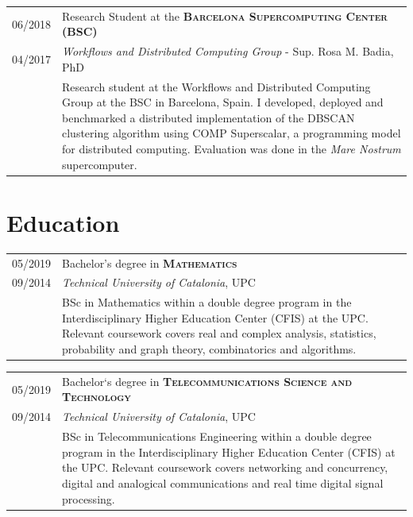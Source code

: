 \documentclass[a4paper,10pt]{article} %
\begin{document}
\begin{tabular}{R{1.5cm}|p{13.8cm}}
    \textsc{06/2018} & Research Student at the \textbf{\textsc{Barcelona Supercomputing Center} (BSC)} \\
    \textsc{04/2017} & \small{\emph{Workflows and Distributed Computing Group} - Sup. Rosa M. Badia, PhD} \\ 
    & \footnotesize{Research student at the Workflows and Distributed Computing Group at the BSC in Barcelona, Spain. I developed, deployed and benchmarked a distributed implementation of the DBSCAN clustering algorithm using COMP Superscalar, a programming model for distributed computing. Evaluation was done in the \textit{Mare Nostrum} supercomputer.}
\end{tabular}

\section{Education}

\begin{tabular}{R{1.5cm}|p{13.8cm}}	
    \textsc{05/2019} & Bachelor's degree in \textbf{\textsc{Mathematics}} \\ 
    \textsc{09/2014} & \small{\emph{Technical University of Catalonia}, UPC}\\
     & \footnotesize{BSc in Mathematics within a double degree program in the Interdisciplinary Higher Education Center (CFIS) at the UPC. Relevant coursework covers real and complex analysis, statistics, probability and graph theory, combinatorics and algorithms.}
\end{tabular}

\begin{tabular}{R{1.5cm}|p{13.8cm}}	
    \textsc{05/2019} &  Bachelor`s degree in \textbf{\textsc{Telecommunications Science and Technology}}\\ 
    \textsc{09/2014} & \small{\emph{Technical University of Catalonia}, UPC} \\
     & \footnotesize{BSc in Telecommunications Engineering within a double degree program in the Interdisciplinary Higher Education Center (CFIS) at the UPC. Relevant coursework covers networking and concurrency, digital and analogical communications and real time digital signal processing.}
\end{tabular}

\end{document}

